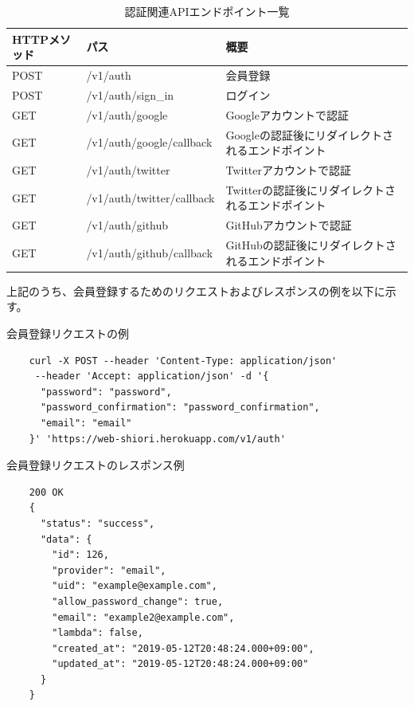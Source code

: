 \begin{table}[htbp]
  \label{tb:design-auth-api}
  \caption{認証関連APIエンドポイント一覧}
  \begin{center}
    \begin{tabular}{|l|l|l|}
      \hline
      HTTPメソッド & パス & 概要 \\\hline\hline
      POST & /v1/auth & 会員登録 \\\hline
      POST & /v1/auth/sign\_in & ログイン \\\hline
      GET & /v1/auth/google & Googleアカウントで認証 \\\hline
      GET & /v1/auth/google/callback & Googleの認証後にリダイレクトされるエンドポイント \\\hline
      GET & /v1/auth/twitter & Twitterアカウントで認証 \\\hline
      GET & /v1/auth/twitter/callback & Twitterの認証後にリダイレクトされるエンドポイント \\\hline
      GET & /v1/auth/github & GitHubアカウントで認証 \\\hline
      GET & /v1/auth/github/callback & GitHubの認証後にリダイレクトされるエンドポイント \\\hline
    \end{tabular}
  \end{center}
\end{table}

上記のうち、会員登録するためのリクエストおよびレスポンスの例を以下に示す。

\begin{itembox}[l]{会員登録リクエストの例}
  \label{auth-request-curl}
  \begin{verbatim}
    curl -X POST --header 'Content-Type: application/json'
     --header 'Accept: application/json' -d '{
      "password": "password",
      "password_confirmation": "password_confirmation",
      "email": "email"
    }' 'https://web-shiori.herokuapp.com/v1/auth'
  \end{verbatim}
\end{itembox}

\begin{itembox}[l]{会員登録リクエストのレスポンス例}
  \label{auth-response-json}
  \begin{verbatim}
    200 OK
    {
      "status": "success",
      "data": {
        "id": 126,
        "provider": "email",
        "uid": "example@example.com",
        "allow_password_change": true,
        "email": "example2@example.com",
        "lambda": false,
        "created_at": "2019-05-12T20:48:24.000+09:00",
        "updated_at": "2019-05-12T20:48:24.000+09:00"
      }
    }
  \end{verbatim}
\end{itembox}

